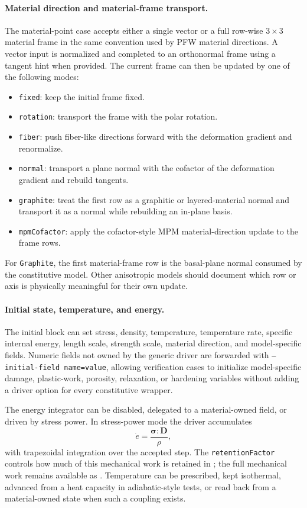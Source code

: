 \paragraph{Material direction and material-frame transport.}
The material-point case accepts either a single vector or a full row-wise \(3\times 3\) material frame in the same convention used by PFW material directions.  A vector input is normalized and completed to an orthonormal frame using a tangent hint when provided.  The current frame can then be updated by one of the following modes:
\begin{itemize}[leftmargin=*]
  \item \texttt{fixed}: keep the initial frame fixed.
  \item \texttt{rotation}: transport the frame with the polar rotation.
  \item \texttt{fiber}: push fiber-like directions forward with the deformation gradient and renormalize.
  \item \texttt{normal}: transport a plane normal with the cofactor of the deformation gradient and rebuild tangents.
  \item \texttt{graphite}: treat the first row as a graphitic or layered-material normal and transport it as a normal while rebuilding an in-plane basis.
  \item \texttt{mpmCofactor}: apply the cofactor-style MPM material-direction update to the frame rows.
\end{itemize}
For \texttt{Graphite}, the first material-frame row is the basal-plane normal consumed by the constitutive model.  Other anisotropic models should document which row or axis is physically meaningful for their own update.

\paragraph{Initial state, temperature, and energy.}
The initial block can set stress, density, temperature, temperature rate, specific internal energy, length scale, strength scale, material direction, and model-specific fields.  Numeric fields not owned by the generic driver are forwarded with \texttt{--initial-field name=value}, allowing verification cases to initialize model-specific damage, plastic-work, porosity, relaxation, or hardening variables without adding a driver option for every constitutive wrapper.

The energy integrator can be disabled, delegated to a material-owned field, or driven by stress power.  In stress-power mode the driver accumulates
\begin{equation}
  \dot e = \frac{\boldsymbol{\sigma}:\mathbf{D}}{\rho},
\end{equation}
with trapezoidal integration over the accepted step.  The \texttt{retentionFactor} controls how much of this mechanical work is retained in ; the full mechanical work remains available as .  Temperature can be prescribed, kept isothermal, advanced from a heat capacity in adiabatic-style tests, or read back from a material-owned state when such a coupling exists.

